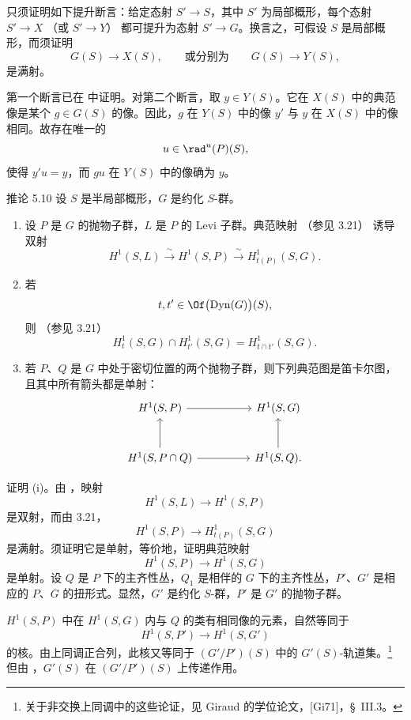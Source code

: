 只须证明如下提升断言：给定态射 \(S'\to S\)，其中 \(S'\) 为局部概形，每个态射 \(S'\to X\) \textup{（或 \(S'\to Y\)）} 都可提升为态射 \(S'\to G\)。换言之，可假设 \(S\) 是局部概形，而须证明
\[
 G(S)\longrightarrow X(S),
 \qquad\text{或分别为}\qquad
 G(S)\longrightarrow Y(S),
\]
是满射。

第一个断言已在  中证明。对第二个断言，取 \(y\in Y(S)\)。它在 \(X(S)\) 中的典范像是某个 \(g\in G(S)\) 的像。因此，\(g\) 在 \(Y(S)\) 中的像 \(y'\) 与 \(y\) 在 \(X(S)\) 中的像相同。故存在唯一的
\[
 u\in\rad^u(P)(S),
\]
使得 \(y'u=y\)，而 \(gu\) 在 \(Y(S)\) 中的像确为 \(y\)。

\begin{sgastatement}{推论 5.10}
设 \(S\) 是半局部概形，\(G\) 是约化 \(S\)-群。
\begin{enumerate}[label=\textup{(\roman*)}]
\item 设 \(P\) 是 \(G\) 的抛物子群，\(L\) 是 \(P\) 的 Levi 子群。典范映射 \textup{（参见 3.21）} 诱导双射
\[
 H^1(S,L)\xrightarrow{\ \sim\ }H^1(S,P)
       \xrightarrow{\ \sim\ }H^1_{t(P)}(S,G).
\]
\item 若
\[
 t,t'\in\Of\bigl(\operatorname{Dyn}(G)\bigr)(S),
\]
则 \textup{（参见 3.21）}
\[
 H^1_t(S,G)\cap H^1_{t'}(S,G)=H^1_{t\cap t'}(S,G).
\]
\item 若 \(P\)、\(Q\) 是 \(G\) 中处于密切位置的两个抛物子群，则下列典范图是笛卡尔图，且其中所有箭头都是单射：
\[
\begin{tikzcd}[column sep=huge,row sep=large]
 H^1(S,P) \arrow[r] & H^1(S,G)\\
 H^1(S,P\cap Q) \arrow[u] \arrow[r] & H^1(S,Q). \arrow[u]
\end{tikzcd}
\]
\end{enumerate}
\end{sgastatement}

证明 \textup{(i)}。由 ，映射
\[
 H^1(S,L)\longrightarrow H^1(S,P)
\]
是双射，而由 3.21，
\[
 H^1(S,P)\longrightarrow H^1_{t(P)}(S,G)
\]
是满射。须证明它是单射，等价地，证明典范映射
\[
 H^1(S,P)\longrightarrow H^1(S,G)
\]
是单射。设 \(Q\) 是 \(P\) 下的主齐性丛，\(Q_1\) 是相伴的 \(G\) 下的主齐性丛，\(P'\)、\(G'\) 是相应的 \(P\)、\(G\) 的扭形式。显然，\(G'\) 是约化 \(S\)-群，\(P'\) 是 \(G'\) 的抛物子群。

\(H^1(S,P)\) 中在 \(H^1(S,G)\) 内与 \(Q\) 的类有相同像的元素，自然等同于
\[
 H^1(S,P')\longrightarrow H^1(S,G')
\]
的核。由上同调正合列，此核又等同于 \((G'/P')(S)\) 中的 \(G'(S)\)-轨道集。\footnote{关于非交换上同调中的这些论证，见 Giraud 的学位论文，\textup{[Gi71]}，\S~III.3。}
但由 ，\(G'(S)\) 在 \((G'/P')(S)\) 上传递作用。

